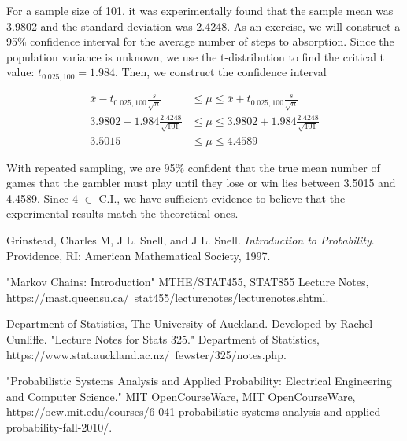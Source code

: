 \documentclass[a4paper, 12pt]{article}
\begin{document}
For a sample size of 101, it was experimentally found that the sample mean was 3.9802 and the standard deviation was 2.4248.
As an exercise, we will construct a 95\% confidence interval for the average number of steps to absorption. Since the population variance is unknown, we use the t-distribution to find the critical t value: $t_{0.025,100} = 1.984$. Then, we construct the confidence interval

	\begin{equation*}
	\begin{aligned}
		 \overline{x} - t_{0.025,100}\frac{s}{\sqrt{n}} &\leq \mu \leq \overline{x} + t_{0.025,100} \frac{s}{\sqrt{n}} \\
		 3.9802 - 1.984\frac{2.4248}{\sqrt{101}} &\leq \mu \leq 3.9802 + 1.984\frac{2.4248}{\sqrt{101}} \\
		 3.5015 &\leq \mu \leq 4.4589
	\end{aligned}
	\end{equation*}

With repeated sampling, we are 95\% confident that the true mean number of games that the gambler must play until they lose or win lies between 3.5015 and 4.4589. Since 4 $\in$ C.I., we have sufficient evidence to believe that the experimental results match the theoretical ones.

\clearpage
\begin{thebibliography}{2}
Grinstead, Charles M, J L. Snell, and J L. Snell. \emph{Introduction to Probability}. Providence, RI: American Mathematical Society, 1997.

"Markov Chains: Introduction" MTHE/STAT455, STAT855 Lecture Notes, https://mast.queensu.ca/~stat455/lecturenotes/lecturenotes.shtml. 

Department of Statistics, The University of Auckland.  Developed by Rachel Cunliffe. "Lecture Notes for Stats 325." Department of Statistics, https://www.stat.auckland.ac.nz/~fewster/325/notes.php. 

"Probabilistic Systems Analysis and Applied Probability: Electrical Engineering and Computer Science." MIT OpenCourseWare, MIT OpenCourseWare, https://ocw.mit.edu/courses/6-041-probabilistic-systems-analysis-and-applied-probability-fall-2010/. 

\end{thebibliography}
\end{document}
